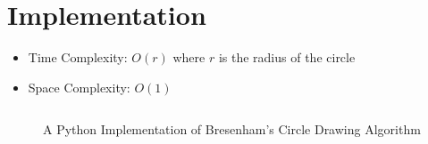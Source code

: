 \documentclass{article}
\begin{document}

\clearpage
\section{Implementation}

\begin{itemize}
    \item Time Complexity: \(O(r)\) where \(r\) is the radius of the circle
    \item Space Complexity: \(O(1)\)
\end{itemize}

\begin{figure}[H]
    \inputminted{python}{bresenham.py}
    \caption*{A Python Implementation of Bresenham's Circle Drawing Algorithm}
\end{figure}

\end{document}
